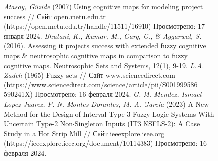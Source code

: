 \documentclass{article}
\begin{document}
\begin{figure}[!t]
\begin{minipage}{0.49\textwidth}
\begin{thebibliography}{}
                 \textit{Atasoy, Güzide} (2007) Using cognitive maps for modeling project success // Сайт open.metu.edu.tr (https://open.metu.edu.tr/handle/11511/16910) Просмотрено: 17 января 2024.
                 \textit{Bhutani, K., Kumar, M., Garg, G., \& Aggarwal, S.} (2016). Assessing it projects success with extended fuzzy cognitive maps \& neutrosophic cognitive maps in comparison to fuzzy cognitive maps. Neutrosophic Sets and Systems, 12(1), 9-19.
                 \textit{L.A. Zadeh} (1965) Fuzzy sets // Сайт www.sciencedirect.com (https://www.sciencedirect.com/science/article/pii/S001999586\\590241X) Просмотрено: 16 февраля 2024.
                 \textit{G. M. Mendez, Ismael Lopez-Juarez, P. N. Montes-Dorantes, M. A. Garcia} (2023) A New Method for the Design of Interval Type-3 Fuzzy Logic Systems With Uncertain Type-2 Non-Singleton Inputs (IT3 NSFLS-2): A Case Study in a Hot Strip Mill // Сайт ieeexplore.ieee.org (https://ieeexplore.ieee.org/document/10114383) Просмотрено: 16 февраля 2024.
            \end{thebibliography}
            ~\\
            ~\\
            ~\\
            ~\\
            ~\\
            ~\\
            ~\\
            ~\\
            ~\\
            ~\\
            ~\\
            ~\\
            ~\\
            ~\\
            ~\\
            ~\\
            ~\\
            ~\\
            ~\\
            ~\\
            ~\\
            ~\\
            ~\\
            ~\\
            ~\\

\end{minipage}
\end{figure}
\end{document}
